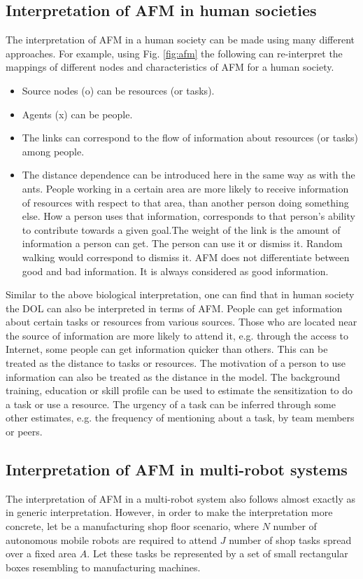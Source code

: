 \subsection{Interpretation of AFM in  human societies}
The interpretation of AFM  in a human society can be made using many different approaches. For example, using Fig. \ref{fig:afm} the following can re-interpret the mappings of different nodes and characteristics of AFM for a human society.
\begin{itemize}
\item Source nodes (o) can be resources (or tasks).
\item Agents (x) can be people.
\item The links can correspond to the flow of information about resources (or tasks) among people.
\item The distance dependence can be introduced here in the same way as with the ants. People working in a certain area are more likely to receive information of resources with respect to that area, than another person doing something else. How a person uses that information, corresponds to that person's ability to contribute towards a given goal.The weight of the link is the amount of information a person can get. The person can use it or dismiss it. Random walking would correspond to dismiss it. AFM does not differentiate between good and bad information. It is always considered as good information. 
\end{itemize}
Similar to the above biological interpretation, one can find that in human society the DOL can also be interpreted in terms of AFM. People can get information about certain tasks or resources from various sources. Those who are located near the source of information are more likely to attend it, e.g. through the access to Internet, some people can get information quicker than others. This can be treated as the distance to tasks or resources. The motivation of a person to use information can also be treated as the distance in the model. The background training, education or skill profile can be used to estimate the sensitization to do a task or use a resource. The urgency of a task can be inferred through some other estimates, e.g. the frequency of mentioning about a task, by team members or peers.
\subsection{Interpretation of AFM in multi-robot systems}
\label{afm:mrs-interpretation}
The interpretation of AFM in a multi-robot system also follows almost exactly as in generic interpretation. However, in order to make the interpretation more concrete, let be a manufacturing shop floor scenario, where $N$ number of autonomous mobile robots are required to attend $J$ number of shop tasks spread over a fixed area $A$. Let these tasks be represented by a set of small rectangular boxes resembling to manufacturing machines.

